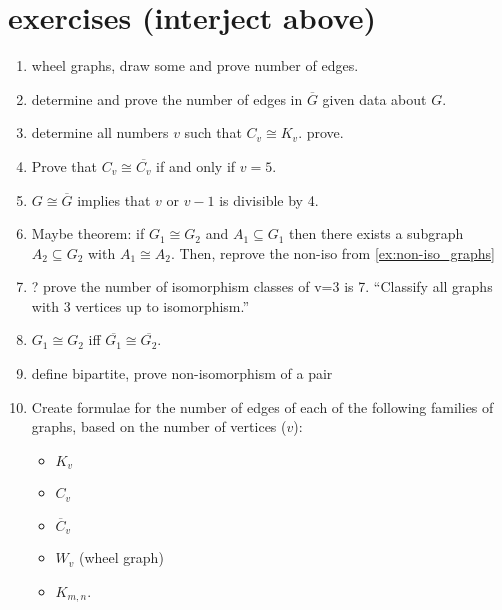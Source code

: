 \section*{exercises (interject above)}
\begin{enumerate}
    \item wheel graphs, draw some and prove number of edges.
    \item determine and prove the number of edges in $\overline{G}$ given data about $G$.
    \item determine all numbers $v$ such that $C_v \cong K_v$. prove.
    \item Prove that $C_v \cong \overline{C_v}$ if and only if $v = 5$.
    \item $G \cong \overline{G}$ implies that $v$ or $v-1$ is divisible by 4.
    \item Maybe theorem: if $G_1 \cong G_2$ and $A_1 \subseteq G_1$ then there exists a subgraph $A_2 \subseteq G_2$ with $A_1 \cong A_2$.  Then, reprove the non-iso from \ref{ex:non-iso_graphs}
    \item ? prove the number of isomorphism classes of v=3 is 7.  ``Classify all graphs with 3 vertices up to isomorphism.''
    \item $G_1 \cong G_2$ iff $\overline{G_1} \cong \overline{G_2}$.
    \item define bipartite, prove non-isomorphism of a pair
    \item Create formulae for the number of edges of each of the following families of graphs, based on the number of vertices ($v$):
    \begin{itemize}
        \item $K_v$
        \item $C_v$
        \item $\overline{C}_v$
        \item $W_v$ (wheel graph)
        \item $K_{m,n}$.
    \end{itemize}
\end{enumerate}
